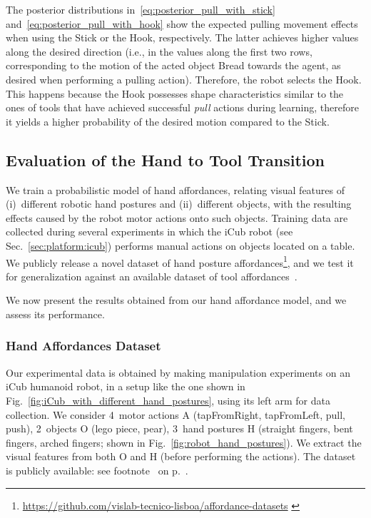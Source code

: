 The posterior distributions in~\eqref{eq:posterior_pull_with_stick} and~\eqref{eq:posterior_pull_with_hook} show the expected pulling movement effects when using the Stick or the Hook, respectively.
The latter achieves higher values along the desired direction (i.e., in the values along the first two rows, corresponding to the motion of the acted object Bread towards the agent, as desired when performing a pulling action).
Therefore, the robot selects the Hook.
This happens because the Hook possesses shape characteristics similar to the ones of tools that have achieved successful \emph{pull} actions during learning, therefore it yields a higher probability of the desired motion compared to the Stick.

\subsection{Evaluation of the Hand to Tool Transition}
\label{sec:tool:results:hand_to_tool}

We train a probabilistic model of hand affordances, relating visual features of (i)~different robotic hand postures and (ii)~different objects, with the resulting effects caused by the robot motor actions onto such objects.
Training data are collected during several experiments in which the iCub robot (see Sec.~\ref{sec:platform:icub}) performs manual actions on objects located on a table.
We publicly release a novel dataset of hand posture affordances\footnote{\url{https://github.com/vislab-tecnico-lisboa/affordance-datasets} \label{footnote:hand_aff_dataset}}, and we test it for generalization against an available dataset of tool affordances~\cite{dehban:2016:eccvws}.

We now present the results obtained from our hand affordance model, and we assess its performance.

\subsubsection{Hand Affordances Dataset}

Our experimental data is obtained by making manipulation experiments on an iCub humanoid robot, in a setup like the one shown in Fig.~\ref{fig:iCub_with_different_hand_postures}, using its left arm for data collection.
We consider 4~motor actions A (tapFromRight, tapFromLeft, pull, push), 2~objects O (lego piece, pear), 3~hand postures H (straight fingers, bent fingers, arched fingers; shown in Fig.~\ref{fig:robot_hand_postures}).
We extract the visual features from both O and H (before performing the actions).
The dataset is publicly available: see footnote~ on p.~\pageref{footnote:hand_aff_dataset}.

